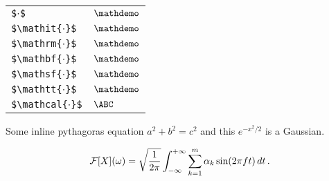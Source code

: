 \bigskip
\noindent
\begin{tabular}{@{}p{16ex}l}
\texttt{\$$\cdot$\$} & $\mathdemo$ \\
\texttt{\$\textbackslash mathit\{$\cdot$\}\$} & $\mathit{\mathdemo}$ \\
\texttt{\$\textbackslash mathrm\{$\cdot$\}\$} & $\mathrm{\mathdemo}$ \\
\texttt{\$\textbackslash mathbf\{$\cdot$\}\$} & $\mathbf{\mathdemo}$ \\
\texttt{\$\textbackslash mathsf\{$\cdot$\}\$} & $\mathsf{\mathdemo}$ \\
\texttt{\$\textbackslash mathtt\{$\cdot$\}\$} & $\mathtt{\mathdemo}$ \\
\texttt{\$\textbackslash mathcal\{$\cdot$\}\$} & $\mathcal{\ABC}$ \\
\end{tabular}

\bigskip
\noindent
Some inline pythagoras equation $a^2 + b^2 = c^2$ and this $e^{-x^2/2}$ is a Gaussian.

\[ {\cal F}[X](\omega) = \sqrt{\frac{1}{2\pi}}\int_{-\infty}^{+\infty} \sum_{k=1}^m \alpha_k\sin(2\pi f t)\,dt\,. \]
